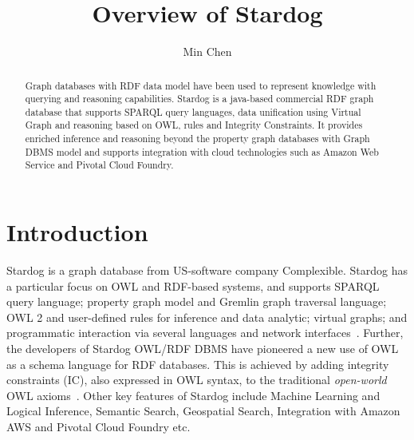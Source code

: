 \title{Overview of Stardog}


\author{Min Chen}


\renewcommand{\shortauthors}{M. Chen}


\begin{abstract}
Graph databases with RDF data model have been used to represent 
knowledge with querying and reasoning capabilities. Stardog is a java-based 
commercial RDF graph database that supports SPARQL query languages, 
data unification using Virtual Graph and reasoning based on OWL, rules and 
Integrity Constraints. It provides enriched inference and reasoning beyond 
the property graph databases with Graph DBMS model and supports 
integration with cloud technologies such as Amazon Web Service and Pivotal 
Cloud Foundry.

\end{abstract}



\maketitle


\section{Introduction}

Stardog is a graph database from US-software company
Complexible. Stardog has a particular focus on OWL and RDF-based
systems, and supports SPARQL query language; property graph model and 
Gremlin graph traversal language; OWL 2 and user-defined rules for 
inference and data analytic; virtual graphs; and
programmatic interaction via several languages and network
interfaces~\cite{hid-sp18-405-www-stardog-docs}. Further, the
developers of Stardog OWL/RDF DBMS have pioneered a new use of OWL as
a schema language for RDF databases. This is achieved by adding
integrity constraints (IC), also expressed in OWL syntax, to the traditional 
\textit{open-world} OWL 
axioms~\cite{hid-sp18-405-cer2012graphical-stardog}. Other key
features of Stardog include Machine Learning and Logical Inference,
Semantic Search, Geospatial Search, Integration with Amazon AWS and 
Pivotal Cloud Foundry etc.\ 


